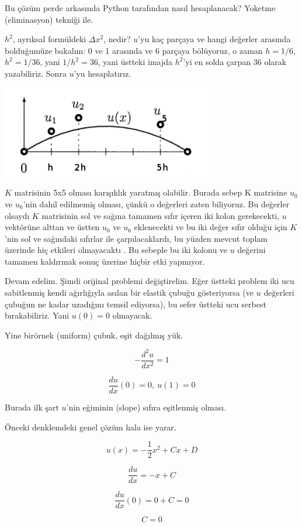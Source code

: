 \documentclass[12pt,fleqn]{article}\usepackage{../../common}
\begin{document}
Bu çözüm perde arkasında Python tarafından nasıl hesaplanacak? Yoketme
(eliminasyon) tekniği ile. 

$h^2$, ayrıksal formüldeki $\Delta x^2$, nedir?  $u$'yu kaç parçaya ve
hangi değerler arasında bolduğumüze bakalım: 0 ve 1 arasında ve 6 parçaya
bölüyoruz, o zaman $h=1/6$, $h^2=1/36$, yani $1/h^2 = 36$, yani üstteki
imajda $h^2$'yi en solda çarpan 36 olarak yazabiliriz. Sonra $u$'yu
hesaplatırız. 

\includegraphics[height=4cm]{2_6.png}

$K$ matrisinin 5x5 olması karışıklık yaratmış olabilir. Burada sebep K
matrisine $u_0$ ve $u_6$'nin dahil edilmemiş olması, çünkü o değerleri
zaten biliyoruz. Bu değerler olsaydı $K$ matrisinin sol ve sağına tamamen
sıfır içeren iki kolon gerekecekti, $u$ vektörüne alttan ve üstten $u_0$ ve
$u_6$ eklenecekti ve bu iki değer sıfır olduğu için $K$'nin sol ve
sağındaki sıfırlar ile çarpılacaklardı, bu yüzden mevcut toplam üzerinde
hiç etkileri olmayacaktı . Bu sebeple bu iki kolonu ve $u$ değerini tamamen
kaldırmak sonuç üzerine hiçbir etki yapmıyor.

Devam edelim. Şimdi orijinal problemi değiştirelim. Eğer üstteki problem
iki ucu sabitlenmiş kendi ağırlığıyla asılan bir elastik çubuğu
gösteriyorsa (ve $u$ değerleri çubuğun ne kadar uzadığını temsil ediyorsa),
bu sefer üstteki ucu serbest bırakabiliriz. Yani $u(0)=0$ olmayacak.

Yine birörnek (uniform) çubuk, eşit dağılmış yük. 

$$ -\frac{d^2u}{dx^2} = 1 $$

$$ \frac{du}{dx}(0) = 0, \ u(1) = 0 $$

Burada ilk şart $u$'nin eğiminin (slope) sıfıra eşitlenmiş olması.

Önceki denklemdeki genel çözüm hala ise yarar. 

$$ u(x) = -\frac{1}{2}x^2 + Cx + D$$

$$ \frac{du}{dx} = -x + C $$

$$ \frac{du}{dx}(0) = 0 + C = 0 $$

$$ C = 0 $$
\end{document}
